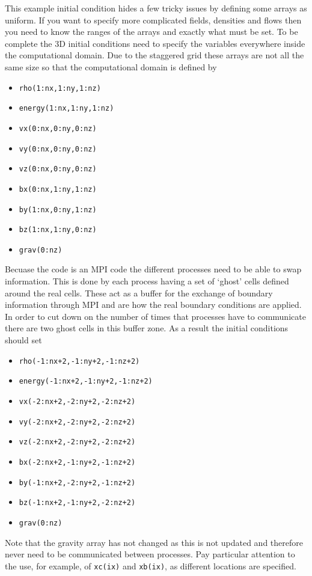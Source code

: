 \documentclass[11pt]{article}
\begin{document}
This example initial condition hides a few tricky issues by defining some arrays as uniform. If you want to specify more complicated fields, densities and flows then you need to know the ranges of the arrays and exactly what must be set. To be complete the 3D initial conditions need to specify the variables everywhere inside the computational domain. Due to the staggered grid these arrays are not all the same size so that the computational domain is defined by
\begin{itemize}
\item \texttt{rho(1:nx,1:ny,1:nz)}
\item \texttt{energy(1:nx,1:ny,1:nz)}
\item \texttt{vx(0:nx,0:ny,0:nz)}
\item \texttt{vy(0:nx,0:ny,0:nz)}
\item \texttt{vz(0:nx,0:ny,0:nz)}
\item \texttt{bx(0:nx,1:ny,1:nz)}
\item \texttt{by(1:nx,0:ny,1:nz)}
\item \texttt{bz(1:nx,1:ny,0:nz)}
\item \texttt{grav(0:nz)}
\end{itemize}
Becuase the code is an MPI code the different processes need to be able to swap information. This is done by each process having a set of `ghost' cells defined around the real cells. These act as a buffer for the exchange of boundary information through MPI and are how the real boundary conditions are applied. In order to cut down on the number of times that processes have to communicate there are two ghost cells in this buffer zone. As a result the initial conditions should set
\begin{itemize}
\item \texttt{rho(-1:nx+2,-1:ny+2,-1:nz+2)}
\item \texttt{energy(-1:nx+2,-1:ny+2,-1:nz+2)}
\item \texttt{vx(-2:nx+2,-2:ny+2,-2:nz+2)}
\item \texttt{vy(-2:nx+2,-2:ny+2,-2:nz+2)}
\item \texttt{vz(-2:nx+2,-2:ny+2,-2:nz+2)}
\item \texttt{bx(-2:nx+2,-1:ny+2,-1:nz+2)}
\item \texttt{by(-1:nx+2,-2:ny+2,-1:nz+2)}
\item \texttt{bz(-1:nx+2,-1:ny+2,-2:nz+2)}
\item \texttt{grav(0:nz)}
\end{itemize}
Note that the gravity array has not changed as this is not updated and therefore never need to be communicated between processes.  Pay particular attention to the use, for example, of \texttt{xc(ix)} and \texttt{xb(ix)}, as different locations are specified. 
\end{document}

